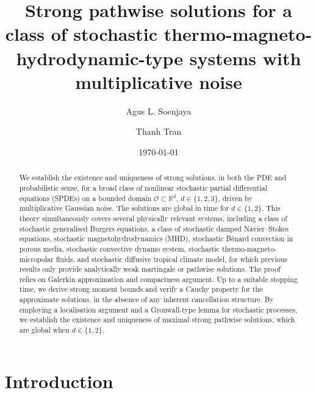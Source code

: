 \documentclass[11pt, reqno]{amsart}
\theoremstyle{definition}
\numberwithin{equation}{section}
\begin{document}
\setcounter{page}{1}

\title[Strong pathwise solutions for a class of stochastic TMHD-type systems]{Strong pathwise solutions for a class of stochastic thermo-magneto-hydrodynamic-type systems with multiplicative noise}

\author[Agus L. Soenjaya]{Agus L. Soenjaya}
\address{School of Mathematics and Statistics, The University of New South Wales, Sydney 2052, Australia}
\email{\textcolor[rgb]{0.00,0.00,0.84}{a.soenjaya@unsw.edu.au}}

\author[Thanh Tran]{Thanh Tran}
\address{School of Mathematics and Statistics, The University of New South Wales, Sydney 2052, Australia}
\email{\textcolor[rgb]{0.00,0.00,0.84}{thanh.tran@unsw.edu.au}}

\date{\today}
\keywords{}
\subjclass{}


\begin{abstract}
    We establish the existence and uniqueness of strong solutions, in both the PDE and probabilistic sense, for a broad class of nonlinear stochastic partial differential equations (SPDEs) on a bounded domain $\mathscr{O}\subset \mathbb{R}^d$, $d\in \{1,2,3\}$, driven by multiplicative Gaussian noise. The solutions are global in time for $d\in \{1,2\}$. This theory simultaneously covers several physically relevant systems, including a class of stochastic generalised Burgers equations, a class of stochastic damped Navier--Stokes equations, stochastic magnetohydrodynamics (MHD), stochastic B\'enard convection in porous media, stochastic convective dynamo system, stochastic thermo-magneto-micropolar fluids, and stochastic diffusive tropical climate model, for which previous results only provide analytically weak martingale or pathwise solutions. The proof relies on Galerkin approximation and compactness argument. Up to a suitable stopping time, we derive strong moment bounds and verify a Cauchy property for the approximate solutions, in the absence of any inherent cancellation structure. By employing a localisation argument and a Gronwall-type lemma for stochastic processes, we establish the existence and uniqueness of maximal strong pathwise solutions, which are global when $d\in \{1,2\}$.
\end{abstract}
\maketitle



\section{Introduction}
\end{document}
